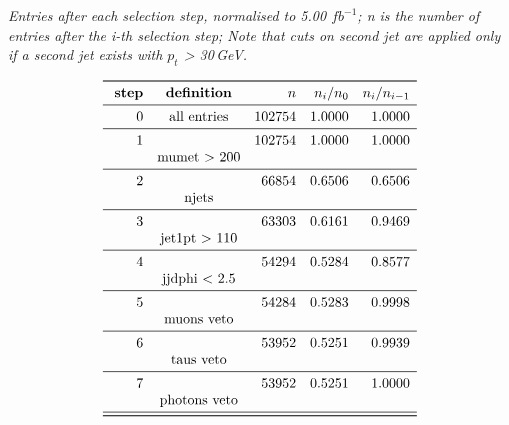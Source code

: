 \documentclass[11pt,a4paper]{article}
\begin{document}
\begin{table}
\caption{\emph{Entries after each selection step, normalised to 5.00 $fb^{-1}$; n is the number of entries after the i-th selection step; Note that cuts on second jet are applied only if a second jet exists with $p_t$ > 30\,GeV.}}
\[
\begin{array}{rcrrr}
\toprule
\ \textbf{step}& \textbf{definition}  & n  &  n_i/n_0 & n_i/n_{i-1}  \\ 
\midrule
 0  & \text{all entries} & 102754 & 1.0000 & 1.0000 \\
\midrule
 1  & & 102754 & 1.0000 & 1.0000 \\
& \text{mumet > 200} & & & \\
\midrule
 2  & &  66854 & 0.6506 & 0.6506 \\
& \text{njets} & & & \\
\midrule
 3  & &  63303 & 0.6161 & 0.9469 \\
& \text{jet1pt >  110} & & & \\
\midrule
 4  & &  54294 & 0.5284 & 0.8577 \\
& \text{jjdphi < 2.5} & & & \\
\midrule
 5  & &  54284 & 0.5283 & 0.9998 \\
& \text{muons veto} & & & \\
\midrule
 6  & &  53952 & 0.5251 & 0.9939 \\
& \text{taus veto} & & & \\
\midrule
 7  & &  53952 & 0.5251 & 1.0000 \\
& \text{photons veto} & & & \\
\midrule
\bottomrule
\end{array}
\]
\end{table}
\end{document}
